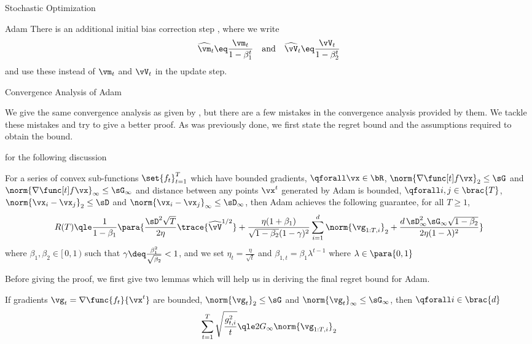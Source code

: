 \documentclass{article}
\begin{document}
\begin{psection}{Stochastic Optimization}
\begin{psubsection}{Adam}
		There is an additional initial bias correction step \citep[see][]{adam}, where we write
		\begin{align*}
			\widehat{\vm}_t	\eq \frac{\vm_t}{1 - \beta_1^t} \quad\text{and}\quad \widehat{\vV}_t \eq \frac{\vV_t}{1 - \beta_2^t}
		\end{align*}
		and use these instead of $\vm_t$ and $\vV_t$ in the update step.

		\begin{pssubsection}{Convergence Analysis of Adam}

			We give the same convergence analysis as given by \cite{adam}, but there are a few mistakes in the convergence analysis provided by them. We tackle these mistakes and try to give a better proof. As was previously done, we first state the regret bound and the assumptions required to obtain the bound.

			 for the following discussion

			\begin{theorem}
				For a series of convex sub-functions $\set{f_t}_{t = 1}^T$ which have bounded gradients, \ie $\qforall \vx \in \bR$, $\norm{\ggf[t]}_2 \le \sG$ and $\norm{\ggf[t]}_{\infty} \le \sG_{\infty}$ and distance between any points $\vx^t$ generated by Adam is bounded, \ie $\qforall i, j \in \brac{T}$, $\norm{\vx_i - \vx_j}_2 \le \sD$ and $\norm{\vx_i - \vx_j}_{\infty} \le \sD_{\infty}$, then Adam achieves the following guarantee, for all $T \ge 1$,
				\begin{align*}
					R(T) \qle \frac{1}{1 - \beta_1} \para{\frac{\sD^2 \sqrt{T}}{2 \eta} \trace{\widehat{\vV}^{1 / 2}} + \frac{\eta (1 + \beta_1)}{\sqrt{1 - \beta_2} (1 - \gamma)^2} \sum_{i = 1}^d \norm{\vg_{1:T, i}}_2 + \frac{d \,\sD_{\infty}^2 \sG_{\infty} \sqrt{1 - \beta_2}}{2 \eta (1 - \lambda)^2}}
				\end{align*}
				where $\beta_1, \beta_2 \in [\,0, 1\,)$ such that $\gamma \deq \frac{\beta_1^2}{\sqrt{\beta_2}} < 1$, and we set $\eta_t = \frac{\eta}{\sqrt{t}}$ and $\beta_{1, t} = \beta_1 \lambda^{t - 1}$ where $\lambda \in \para{0, 1}$
				\label{th:adam-regret}
			\end{theorem}

			Before giving the proof, we first give two lemmas which will help us in deriving the final regret bound for Adam.

			\begin{lemma}
				If gradients $\vg_t = \nabla \func{f_t}{\vx^t}$ are bounded, \ie $\norm{\vg_t}_2 \le \sG$ and $\norm{\vg_t}_\infty \le \sG_{\infty}$, then $\qforall i \in \brac{d}$
				\begin{align*}
					\sum_{t = 1}^T \sqrt{\frac{g_{t, i}^2}{t}} \qle 2 G_{\infty} \norm{\vg_{1:T, i}}_2
				\end{align*}


\end{lemma}
\end{pssubsection}
\end{psubsection}
\end{psection}
\end{document}
